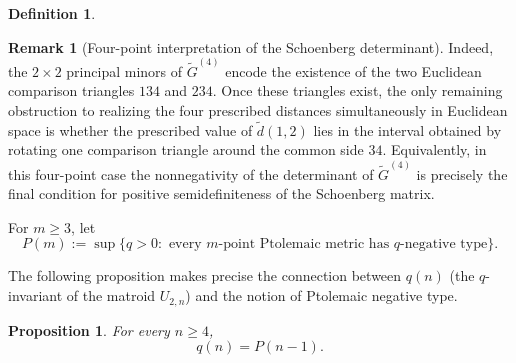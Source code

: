 \documentclass[12pt]{amsart}
\newtheorem{proposition}[theorem]{Proposition}
\theoremstyle{definition}
\newtheorem{definition}[theorem]{Definition}
\newtheorem{remark}[theorem]{Remark}
\newcommand{\1}{\mathbf{1}}
\begin{document}
\begin{definition}
\begin{remark}[Four-point interpretation of the Schoenberg determinant]
Indeed, the $2\times2$ principal minors of $\widetilde G^{(4)}$ encode
the existence of the two Euclidean comparison triangles $134$ and $234$.
Once these triangles exist, the only remaining obstruction to realizing the
four prescribed distances simultaneously in Euclidean space is whether the
prescribed value of $\widetilde d(1,2)$ lies in the interval obtained by
rotating one comparison triangle around the common side $34$. Equivalently,
in this four-point case the nonnegativity of the determinant of
$\widetilde G^{(4)}$ is precisely the final condition for positive
semidefiniteness of the Schoenberg matrix.
\end{remark}

For $m\ge3$, let
\[
        P(m):=\sup\{q>0:\text{ every $m$-point Ptolemaic metric has
        $q$-negative type}\}.
\]
\end{definition}

The following proposition makes precise the connection between $q(n)$ (the $q$-invariant of the matroid $U_{2,n}$) and the notion of Ptolemaic
negative type.

\begin{proposition}
\label{prop:qn-Pn}
For every $n\ge4$,
\[
        q(n)=P(n-1).
\]
\end{proposition}
\end{document}
